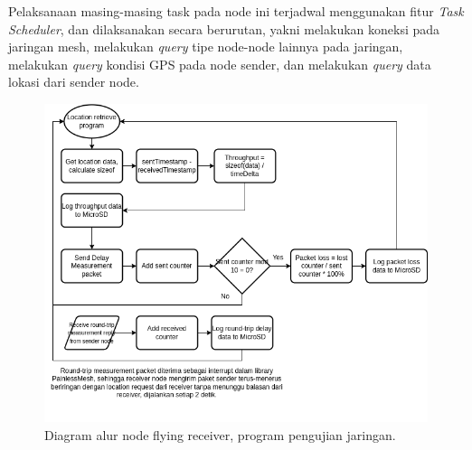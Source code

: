 Pelaksanaan masing-masing task pada node ini terjadwal menggunakan fitur \textit{Task Scheduler}, dan dilaksanakan secara berurutan, yakni melakukan koneksi pada jaringan mesh, melakukan \textit{query} tipe node-node lainnya pada jaringan, melakukan \textit{query} kondisi GPS pada node sender, dan melakukan \textit{query} data lokasi dari sender node.

\begin{figure}[H]
	\centering
	\includegraphics[scale=0.5]{./assets/FlowchartNetworkTestNew}
	\caption{Diagram alur node flying receiver, program pengujian jaringan.}
\end{figure}

